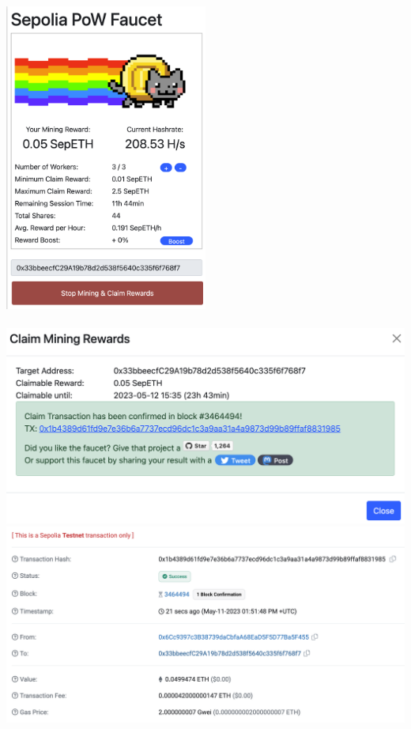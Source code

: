 \documentclass[14pt,a4paper]{extarticle}
\begin{document}
	\includegraphics[width=0.5\textwidth]{images/mining.png}
	\newpage
	 \\ \\
	\includegraphics[width=\textwidth]{images/rewards.png}
	\includegraphics[width=\textwidth]{images/rewards_tx.png}
	\newpage
	 \\ \\
\end{document}
